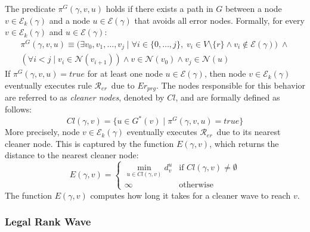 \documentclass[a4paper, 12pt]{article}
\newcommand{\Neig}{\mathcal{N}}
\newcommand{\Rer}{$\mathscr{R}_{er}$}
\begin{document}
The predicate $\pi^G(\gamma, v, u)$ holds if there exists a path in $G$ 
between a node $v \in \mathcal{E}_k(\gamma)$ and a node 
$u \in \mathcal{E}(\gamma)$ that avoids all error nodes. Formally, for 
every $v \in \mathcal{E}_k(\gamma)$ and $u \in \mathcal{E}(\gamma)$:
\begin{equation}
\begin{split}
    \pi^G(\gamma,v,u) \equiv 
    \bigl(\exists v_0, v_1, \dots, v_j \mid 
    \forall i \in \{0,\dots,j\},\; v_i \in V \setminus \{r\} 
    \wedge v_i \notin \mathcal{E}(\gamma)\bigr) \;\wedge \\
    (\forall i < j \mid v_i \in \Neig(v_{i+1})) 
    \wedge v \in \Neig(v_0) \wedge v_j \in \Neig(u)
\end{split}
\end{equation}
If $\pi^G(\gamma, v, u) = \mathit{true}$ for at least one node 
$u \in \mathcal{E}(\gamma)$, then node $v \in \mathcal{E}_k(\gamma)$ 
eventually executes rule \Rer\ due to $Er_{prg}$. The nodes responsible 
for this behavior are referred to as \emph{cleaner nodes}, denoted by 
$Cl$, and are formally defined as follows:
\begin{equation}
    Cl(\gamma, v) = \{u \in G^*(v) \mid \pi^G(\gamma, v, u) = 
    \mathit{true}\}
\end{equation}
More precisely, node $v \in \mathcal{E}_k(\gamma)$ eventually executes 
\Rer\ due to its nearest cleaner node. This is captured by the function 
$E(\gamma, v)$, which returns the distance to the nearest cleaner node:
\begin{equation}
    E(\gamma, v) =
    \begin{cases}
        \min_{u \in Cl(\gamma,v)} d^u_v & \text{if } 
        Cl(\gamma,v) \neq \emptyset \\
        \infty & \text{otherwise}
    \end{cases}
\end{equation}
The function $E(\gamma, v)$ computes how long it takes for a cleaner 
wave to reach $v$.

\subsubsection{Legal Rank Wave}
\label{subsub:goodrank}
\end{document}
